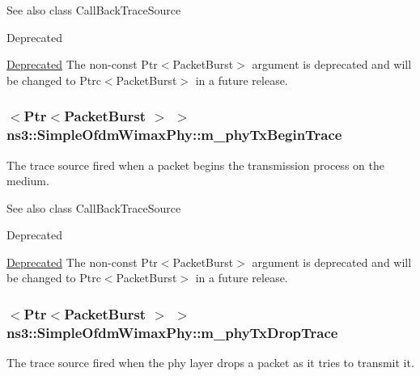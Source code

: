 \begin{DoxySeeAlso}{See also}
class Call\+Back\+Trace\+Source 
\end{DoxySeeAlso}
\begin{DoxyRefDesc}{Deprecated}
\item[\hyperlink{deprecated__deprecated000041}{Deprecated}]The non-\/const {\ttfamily Ptr$<$\+Packet\+Burst$>$} argument is deprecated and will be changed to {\ttfamily Ptrc$<$\+Packet\+Burst$>$} in a future release. \end{DoxyRefDesc}
\subsubsection[{\texorpdfstring{m\+\_\+phy\+Tx\+Begin\+Trace}{m_phyTxBeginTrace}}]{$<${\bf Ptr}$<${\bf Packet\+Burst} $>$ $>$ ns3\+::\+Simple\+Ofdm\+Wimax\+Phy\+::m\+\_\+phy\+Tx\+Begin\+Trace\hspace{0.3cm}{\ttfamily [private]}}\hypertarget{classns3_1_1SimpleOfdmWimaxPhy_a21e5bdd806cdcf9776bf226d23fc98ca}{}\label{classns3_1_1SimpleOfdmWimaxPhy_a21e5bdd806cdcf9776bf226d23fc98ca}
The trace source fired when a packet begins the transmission process on the medium.

\begin{DoxySeeAlso}{See also}
class Call\+Back\+Trace\+Source 
\end{DoxySeeAlso}
\begin{DoxyRefDesc}{Deprecated}
\item[\hyperlink{deprecated__deprecated000037}{Deprecated}]The non-\/const {\ttfamily Ptr$<$\+Packet\+Burst$>$} argument is deprecated and will be changed to {\ttfamily Ptrc$<$\+Packet\+Burst$>$} in a future release. \end{DoxyRefDesc}
\subsubsection[{\texorpdfstring{m\+\_\+phy\+Tx\+Drop\+Trace}{m_phyTxDropTrace}}]{$<${\bf Ptr}$<${\bf Packet\+Burst} $>$ $>$ ns3\+::\+Simple\+Ofdm\+Wimax\+Phy\+::m\+\_\+phy\+Tx\+Drop\+Trace\hspace{0.3cm}{\ttfamily [private]}}\hypertarget{classns3_1_1SimpleOfdmWimaxPhy_aebbb0af4dbce1a78fa142597a96b3910}{}\label{classns3_1_1SimpleOfdmWimaxPhy_aebbb0af4dbce1a78fa142597a96b3910}
The trace source fired when the phy layer drops a packet as it tries to transmit it.

